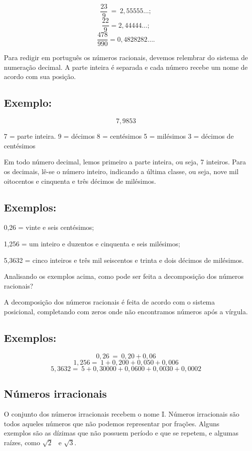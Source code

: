 $$\frac{23}{9}\  = \ 2,55555\ldots;$$
$$\frac{22}{9} = 2,44444\ldots;$$
$$\frac{478}{990} = 0,4828282\ldots{}.$$

Para redigir em português os números racionais, devemos relembrar do
sistema de numeração decimal. A parte inteira é separada e cada número
recebe um nome de acordo com sua posição.

\subsection{Exemplo:} 


$$7,9853$$

7 = parte inteira. 9 = décimos 8 = centésimos 5 = milésimos 3 = décimos
de centésimos

Em todo número decimal, lemos primeiro a parte inteira, ou seja, 7
inteiros. Para os decimais, lê-se o número inteiro, indicando a última
classe, ou seja, nove mil oitocentos e cinquenta e três décimos de
milésimos.

\subsection{Exemplos:}

0,26 = vinte e seis centésimos;

1,256 = um inteiro e duzentos e cinquenta e seis milésimos;

5,3632 = cinco inteiros e três mil seiscentos e trinta e dois décimos de
milésimos.

Analisando os exemplos acima, como pode ser feita a decomposição dos
números racionais?

A decomposição dos números racionais é feita de acordo com o sistema
posicional, completando com zeros onde não encontramos números após a
vírgula.

\subsection{Exemplos:}

$$0,26\  = \ 0,20 + 0,06$$
$$1,256 = \ 1 + 0,200 + 0,050 + 0,006$$
$$5,3632 = \ 5 + 0,30000 + 0,0600 + 0,0030 + 0,0002$$

\subsection{Números irracionais}

O conjunto dos números irracionais recebem o nome 𝕀. Números irracionais
são todos aqueles números que não podemos representar por frações.
Alguns exemplos são as dízimas que não possuem período e que se repetem,
e algumas raízes, como $\sqrt{2}$ \ e $\sqrt{3}$.



